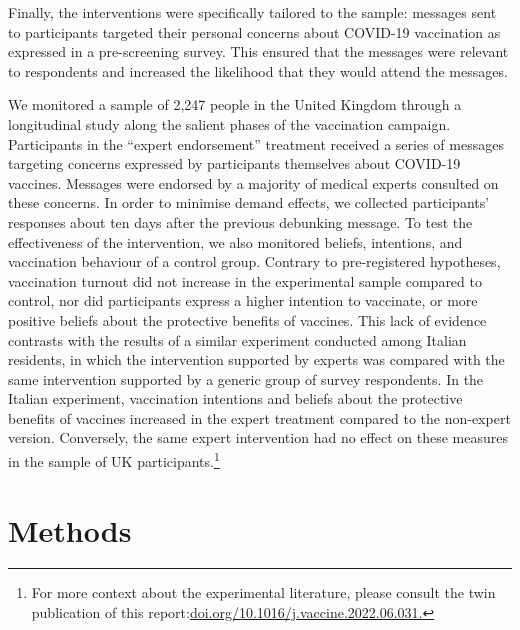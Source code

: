 \documentclass[authordate, empirical]{jote-new-article}
\begin{document}
Finally, the interventions were specifically tailored to the sample: messages sent to participants targeted their personal concerns about COVID-19 vaccination as expressed in a pre-screening survey. This ensured that the messages were relevant to respondents and increased the likelihood that they would attend the messages.



We monitored a sample of 2,247 people in the United Kingdom through a longitudinal study along the salient phases of the vaccination campaign. Participants in the “expert endorsement” treatment received a series of messages targeting concerns expressed by participants themselves about COVID-19 vaccines. Messages were endorsed by a majority of medical experts consulted on these concerns. In order to minimise demand effects, we collected participants' responses about ten days after the previous debunking message. To test the effectiveness of the intervention, we also monitored beliefs, intentions, and vaccination behaviour of a control group. Contrary to pre-registered hypotheses, vaccination turnout did not increase in the experimental sample compared to control, nor did participants express a higher intention to vaccinate, or more positive beliefs about the protective benefits of vaccines. This lack of evidence contrasts with the results of a similar experiment conducted among Italian residents, \parencites{Ronzani2022} in which the intervention supported by experts was compared with the same intervention supported by a generic group of survey respondents. In the Italian experiment, vaccination intentions and beliefs about the protective benefits of vaccines increased in the expert treatment compared to the non-expert version. Conversely, the same expert intervention had no effect on these measures in the sample of UK participants.\footnote{ For more context about the experimental literature, please consult the twin publication of this report:\href{https://doi.org/10.1016/j.vaccine.2022.06.031}{doi.org/10.1016/j.vaccine.2022.06.031.}}



\section{Methods}
\end{document}
